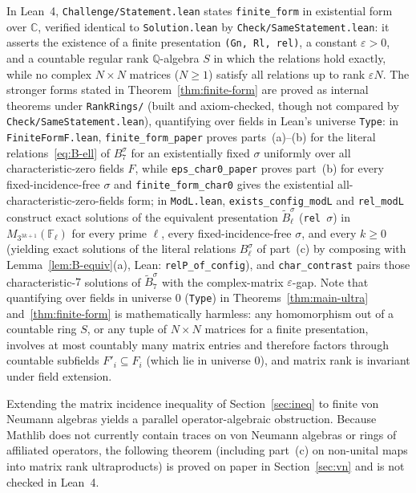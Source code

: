 \documentclass[11pt]{article}
\theoremstyle{definition}
\theoremstyle{remark}
\numberwithin{equation}{section}
\newcommand{\Q}{\mathbb{Q}}
\newcommand{\C}{\mathbb{C}}
\newcommand{\F}{\mathbb{F}}
\newcommand{\1}{\mathbf{1}}
\newcommand{\code}[1]{{\normalfont\small\texttt{#1}}}
\begin{document}
In Lean~4, \code{Challenge/Statement.lean} states \code{finite\_form} in existential form over $\C$, verified identical to \code{Solution.lean} by \code{Check/SameStatement.lean}: it asserts the existence of a finite presentation \code{(Gn, Rl, rel)}, a constant $\varepsilon > 0$, and a countable regular rank $\Q$-algebra $S$ in which the relations hold exactly, while no complex $N \times N$ matrices ($N \ge 1$) satisfy all relations up to rank $\varepsilon N$. The stronger forms stated in Theorem~\ref{thm:finite-form} are proved as internal theorems under \code{RankRings/} (built and axiom-checked, though not compared by \code{Check/SameStatement.lean}), quantifying over fields in Lean's universe \code{Type}: in \code{FiniteFormF.lean}, \code{finite\_form\_paper} proves parts~(a)--(b) for the literal relations~\eqref{eq:B-ell} of $B_7^\sigma$ for an existentially fixed $\sigma$ uniformly over all characteristic-zero fields $F$, while \code{eps\_char0\_paper} proves part~(b) for every fixed-incidence-free $\sigma$ and \code{finite\_form\_char0} gives the existential all-characteristic-zero-fields form; in \code{ModL.lean}, \code{exists\_config\_modL} and \code{rel\_modL} construct exact solutions of the equivalent presentation $\widetilde{B}_\ell^\sigma$ (\code{rel $\sigma$}) in $M_{3^{3k+1}}(\F_\ell)$ for every prime $\ell$, every fixed-incidence-free $\sigma$, and every $k \ge 0$ (yielding exact solutions of the literal relations $B_\ell^\sigma$ of part~(c) by composing with Lemma~\ref{lem:B-equiv}(a), Lean: \code{relP\_of\_config}), and \code{char\_contrast} pairs those characteristic-$7$ solutions of $\widetilde{B}_7^\sigma$ with the complex-matrix $\varepsilon$-gap. Note that quantifying over fields in universe $0$ (\code{Type}) in Theorems~\ref{thm:main-ultra} and~\ref{thm:finite-form} is mathematically harmless: any homomorphism out of a countable ring $S$, or any tuple of $N \times N$ matrices for a finite presentation, involves at most countably many matrix entries and therefore factors through countable subfields $F'_i \subseteq F_i$ (which lie in universe $0$), and matrix rank is invariant under field extension.

Extending the matrix incidence inequality of Section~\ref{sec:ineq} to finite von Neumann algebras yields a parallel operator-algebraic obstruction. Because Mathlib does not currently contain traces on von Neumann algebras or rings of affiliated operators, the following theorem (including part~(c) on non-unital maps into matrix rank ultraproducts) is proved on paper in Section~\ref{sec:vn} and is not checked in Lean~4.
\end{document}
